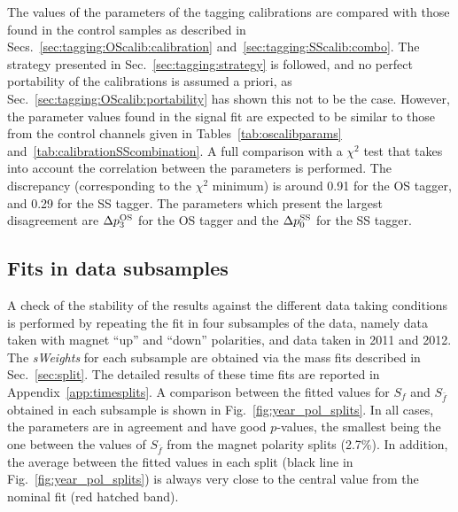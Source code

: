 The values of the parameters of the tagging calibrations are compared with those found in the control samples
as described in Secs.~\ref{sec:tagging:OScalib:calibration} and~\ref{sec:tagging:SScalib:combo}. The strategy presented in Sec.~\ref{sec:tagging:strategy} is followed, 
and no perfect portability of the calibrations is assumed a priori, as Sec.~\ref{sec:tagging:OScalib:portability} has shown this not to be the case.
However, the parameter values found in the signal fit are expected to be similar to
those from the control channels given in Tables~\ref{tab:oscalibparams} and~\ref{tab:calibrationSScombination}. 
A full comparison with a $\chi^2$ test that takes into account the correlation between
the parameters is performed. The discrepancy (corresponding to the
$\chi^2$ minimum) is around \SI{0.91}{\sigma} for the OS tagger, and \SI{0.29}{\sigma} for the SS tagger. The parameters which present the largest disagreement are
$\Delta p_{3}^{\rm OS}$ for the OS tagger and the $\Delta p_{0}^{\rm SS}$ for the SS tagger.

\subsection{Fits in data subsamples}
\label{sec:timefitsplits}
A check of the stability of the results against the different data taking conditions is performed by repeating the
fit in four subsamples of the data, namely data taken with magnet ``up'' and ``down'' polarities, and data taken in 2011
and 2012. The \emph{sWeights} for each subsample are obtained via the mass fits described in Sec.~\ref{sec:split}.
The detailed results of these time fits are reported in Appendix~\ref{app:timesplits}. A comparison between the
fitted values for $S_f$ and $S_{\bar f}$ obtained in each subsample is shown in Fig.~\ref{fig:year_pol_splits}.
In all cases, the parameters are in agreement and have good $p$-values, the smallest being the one between the values of
$S_{\bar{f}}$ from the magnet polarity splits (2.7\%). In addition, the average between the fitted
values in each split (black line in Fig.~\ref{fig:year_pol_splits}) is always very close to the central value from
the nominal fit (red hatched band).

